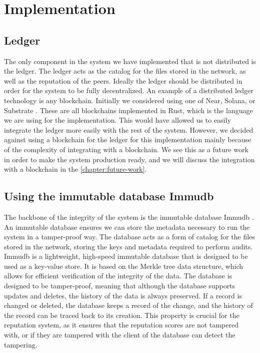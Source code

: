 \chapter{Implementation}
\label{chapter:implementation}

\section{Ledger}

The only component in the system we have implemented that is not distributed is the ledger.
The ledger acts as the catalog for the files stored in the network,
as well as the reputation of the peers.
Ideally the ledger should be distributed in order for the system to be fully decentralized.
An example of a distributed ledger technology is any blockchain.
Initially we considered using one of Near, Solana, or Substrate \cite{near, solana, substrate}.
These are all blockchains implemented in Rust, which is the language we are using for the implementation.
This would have allowed us to easily integrate the ledger more easily with the rest of the system.
However, we decided against using a blockchain for the ledger for this implementation
mainly because of the complexity of integrating with a blockchain.
We see this as a future work in order to make the system production ready,
and we will discuss the integration with a blockchain in the \autoref{chapter:future-work}.

\section{Using the immutable database Immudb}
\label{section:using-immudb}

The backbone of the integrity of the system is the immutable database Immudb \cite{immudb}.
An immutable database ensures we can store the metadata necessary to run the system
in a tamper-proof way.
The database acts as a form of catalog for the files stored in the network,
storing the keys and metadata required to perform audits.
Immudb is a lightweight, high-speed immutable database that is designed to be used as a key-value store.
It is based on the Merkle tree data structure, which allows for efficient verification of the integrity of the data.
The database is designed to be tamper-proof, meaning that although the database supports updates and deletes,
the history of the data is always preserved.
If a record is changed or deleted,
the database keeps a record of the change, and the history of the record can be traced back to its creation.
This property is crucial for the reputation system, as it ensures that the reputation scores are not tampered with,
or if they are tampered with the client of the database can detect the tampering.

